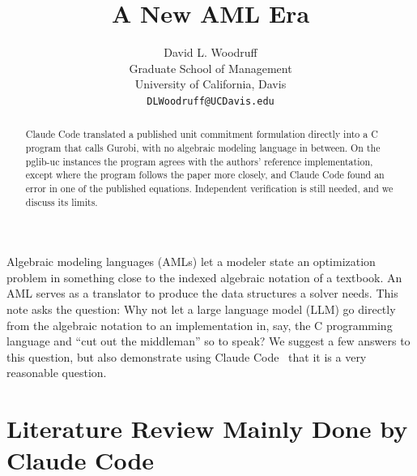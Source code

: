 \documentclass[11pt]{article}
\title{A New AML Era}
\author{David L. Woodruff\\Graduate School of Management\\University of California, Davis\\\texttt{DLWoodruff@UCDavis.edu}}
\date{}
\begin{document}
\maketitle

\begin{abstract}
Claude Code translated a published unit commitment formulation directly into a C program that calls Gurobi, with no algebraic modeling language in between. On the pglib-uc instances the program agrees with the authors' reference implementation, except where the program follows the paper more closely, and Claude Code found an error in one of the published equations. Independent verification is still needed, and we discuss its limits.
\end{abstract}

Algebraic modeling languages (AMLs) let a modeler state an
optimization problem in something close to the indexed algebraic
notation of a textbook. An AML serves as a translator to produce the data
structures a solver needs.  This note asks the question: Why not let a
large language model (LLM) go directly from the algebraic notation to
an implementation in, say, the C programming language and ``cut out the
middleman'' so to speak? We suggest a few answers to this question, but
also demonstrate using Claude Code~\cite{claudecode} that it is a very
reasonable question.


\section{Literature Review Mainly Done by Claude Code}
\end{document}

